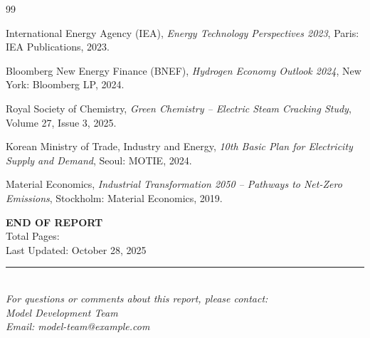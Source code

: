 \documentclass[11pt,a4paper]{report}
\begin{document}
\begin{thebibliography}{99}

International Energy Agency (IEA),
\textit{Energy Technology Perspectives 2023},
Paris: IEA Publications, 2023.

Bloomberg New Energy Finance (BNEF),
\textit{Hydrogen Economy Outlook 2024},
New York: Bloomberg LP, 2024.

Royal Society of Chemistry,
\textit{Green Chemistry -- Electric Steam Cracking Study},
Volume 27, Issue 3, 2025.

Korean Ministry of Trade, Industry and Energy,
\textit{10th Basic Plan for Electricity Supply and Demand},
Seoul: MOTIE, 2024.

Material Economics,
\textit{Industrial Transformation 2050 -- Pathways to Net-Zero Emissions},
Stockholm: Material Economics, 2019.

\end{thebibliography}

\cleardoublepage
{}
{}

\vspace*{3cm}
\begin{center}
{\Huge\textbf{END OF REPORT}}\\[1cm]
{\large Total Pages: \pageref{LastPage}}\\[0.5cm]
{\large Last Updated: October 28, 2025}\\[2cm]

\rule{\textwidth}{0.4pt}\\[0.5cm]

\textit{For questions or comments about this report, please contact:\\
Model Development Team\\
Email: model-team@example.com}

\end{center}

\label{LastPage}
\end{document}
